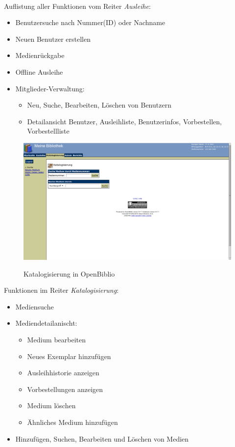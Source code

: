 \documentclass[fontsize=12pt,paper=a4,twoside]{scrartcl}
\begin{document}
\\
Auflistung aller Funktionen vom Reiter \emph{Ausleihe}:
\begin{itemize}
	\item Benutzersuche nach Nummer(ID) oder Nachname
	\item Neuen Benutzer erstellen
	\item Medienrückgabe
	\item Offline Ausleihe
	\item Mitglieder-Verwaltung:
	\begin{itemize}
		\item Neu, Suche, Bearbeiten, Löschen von Benutzern
		\item Detailansicht Benutzer, Ausleihliste, Benutzerinfos, Vorbestellen, Vorbestellliste
	\end{itemize}
\end{itemize}
\newpage
\begin{figure}[h]
\caption{Katalogisierung in OpenBiblio}
\includegraphics[width=1\textwidth]{OpenBiblio/reiter_katalogisierung.png}
  \label{katalogisierung-openbiblio}
\end{figure}
Funktionen im Reiter \emph{Katalogisierung}:
\begin{itemize}
	\item Mediensuche
	\item Mediendetailanischt:
	\begin{itemize}
		\item Medium bearbeiten
		\item Neues Exemplar hinzufügen
		\item Ausleihhistorie anzeigen
		\item Vorbestellungen anzeigen
		\item Medium löschen
		\item Ähnliches Medium hinzufügen
	\end{itemize}
	\item Hinzufügen, Suchen, Bearbeiten und Löschen von Medien
\end{itemize}
\end{document}
